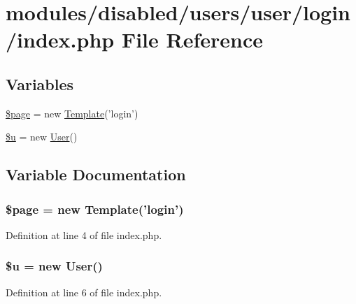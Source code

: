 \hypertarget{modules_2disabled_2users_2user_2login_2index_8php}{\section{modules/disabled/users/user/login/index.php File Reference}
\label{modules_2disabled_2users_2user_2login_2index_8php}
}
\subsection*{Variables}
\begin{DoxyCompactItemize}
\item 
\hyperlink{modules_2disabled_2users_2user_2login_2index_8php_a0a44e6760141442bb439b1ab1395d8ff}{\$page} = new \hyperlink{class_template}{Template}('login')
\item 
\hyperlink{modules_2disabled_2users_2user_2login_2index_8php_ad9bcfd597eba04db946451e8368a1f05}{\$u} = new \hyperlink{class_user}{User}()
\end{DoxyCompactItemize}


\subsection{Variable Documentation}
\hypertarget{modules_2disabled_2users_2user_2login_2index_8php_a0a44e6760141442bb439b1ab1395d8ff}{
\subsubsection[{\$page}]{\setlength{\rightskip}{0pt plus 5cm}\$page = new {\bf Template}('login')}}\label{modules_2disabled_2users_2user_2login_2index_8php_a0a44e6760141442bb439b1ab1395d8ff}


Definition at line 4 of file index.\-php.

\hypertarget{modules_2disabled_2users_2user_2login_2index_8php_ad9bcfd597eba04db946451e8368a1f05}{
\subsubsection[{\$u}]{\setlength{\rightskip}{0pt plus 5cm}\$u = new {\bf User}()}}\label{modules_2disabled_2users_2user_2login_2index_8php_ad9bcfd597eba04db946451e8368a1f05}


Definition at line 6 of file index.\-php.

